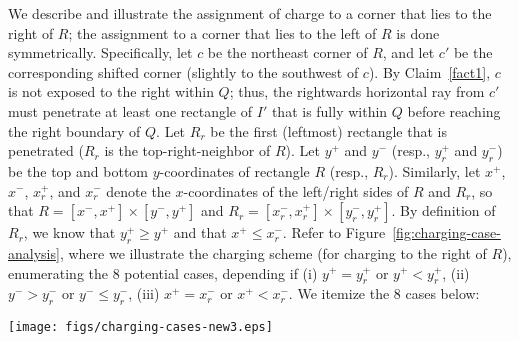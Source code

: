\documentclass{article}
\begin{document}
We describe and illustrate the assignment of charge to a corner that lies to the right of $R$;
the assignment to a corner that lies to the left of $R$ is done symmetrically.
Specifically, let $c$ be the northeast corner of $R$, and let $c'$ be the
corresponding shifted corner (slightly to the southwest of $c$). By
Claim~\ref{fact1}, $c$ is not exposed to the right within $Q$; thus,
the rightwards horizontal ray from $c'$ must penetrate at least one
rectangle of $I'$ that is fully within $Q$ before reaching the right boundary of
$Q$. Let $R_r$ be the first (leftmost) rectangle that is penetrated ($R_r$ is the top-right-neighbor of $R$).
%
Let $y^+$ and $y^-$ (resp., $y^+_r$ and $y^-_r$) be the top and bottom
$y$-coordinates of rectangle $R$ (resp., $R_r$). Similarly, let $x^+$,
$x^-$, $x^+_r$, and $x^-_r$ denote the $x$-coordinates of the
left/right sides of $R$ and $R_r$, so that
$R=[x^-,x^+]\times[y^-,y^+]$ and
$R_r=[x_r^-,x_r^+]\times[y_r^-,y_r^+]$.  By definition of $R_r$, we
know that $y^+_r \geq y^+$ and that $x^+\leq x^-_r$.
%
Refer to Figure~\ref{fig:charging-case-analysis}, where we illustrate the
charging scheme (for charging to the right of $R$), enumerating the 8 potential cases, depending if (i)
$y^+=y^+_r$ or $y^+<y^+_r$, (ii) $y^->y^-_r$ or $y^-\leq y^-_r$, (iii)
$x^+=x^-_r$ or $x^+<x^-_r$.
%
We itemize the 8 cases below:

%
\begin{figure*}[!ht]
	\centering
	\texttt{[image: figs/charging-cases-new3.eps]}
	\caption{Case analysis for the charging scheme when a non-red
          rectangle $R$ is crossed by a vertical portion (shown
          dashed), $\sigma$, of a cut $\chi$.  The charged corner is
          labelled $c_r$, for the possible cases (1), (3), (5),
          (6). The fences established after the cut are shown in
          red. Here, we only show the case of charging to the right of
          the crossed rectangle~$R$, assigning a charge of 1/2 to an appropriately selected corner; symmetrically, we also charge 1/2 to a corner that is to the left of~$R$. 
          .}
	\label{fig:charging-case-analysis}
\end{figure*}
\end{document}
